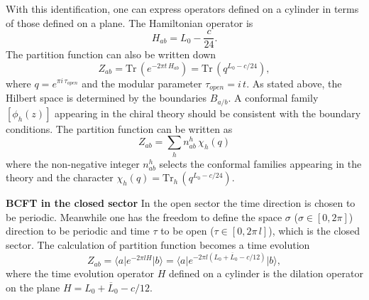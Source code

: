\documentclass[submission, PhysLectNotes]{SciPost}
\begin{document}
With this identification, one can express operators defined on a cylinder in terms of those defined on a plane. The Hamiltonian operator is 
\begin{equation}
    H_{ab} = L_0 - \frac{c}{24}. 
\end{equation}
The partition function can also be written down 
\begin{equation}
    Z_{ab} = \mathrm{Tr}\,\left( e^{-2\pi t\, H_{ab}}\right) = \mathrm{Tr}\,\left( q^{L_0-c/24}\right),
\end{equation}
where $q=e^{\pi i\, \tau_{open}}$ and the modular parameter $\tau_{open} = i\,t$. As stated above, the Hilbert space is determined by the boundaries $B_{a/b}$. A conformal family $[\phi_{h}(z)]$ appearing in the chiral theory should be consistent with the boundary conditions. The partition function can be written as 
\begin{equation}
    Z_{ab} = \sum_h n_{ab}^h\, \chi_h(q)
\end{equation}
where the non-negative integer $n_{ab}^h$ selects the conformal families appearing in the theory and the character $\chi_h(q) = \mathrm{Tr}_h\,\left( q^{L_0-c/24}\right)$.

{\bf BCFT in the closed sector}
In the open sector the time direction is chosen to be periodic. Meanwhile one has the freedom to define the space $\sigma$ ($\sigma \in [0,2\pi]$) direction to be periodic and time $\tau$ to be open ($\tau \in [0,2\pi\,l]$), which is the closed sector. The calculation of partition function becomes a time evolution
\begin{equation}
    Z_{ab} = \langle a \vert e^{-2\pi l H} \vert b \rangle = \langle a \vert e^{-2\pi l (L_0 + \overline{L}_0 -c/12)} \vert b \rangle,
\end{equation}
where the time evolution operator $H$ defined on a cylinder is the dilation operator on the plane $H = L_0 + \overline{L}_0 - c/12$. 
\end{document}
